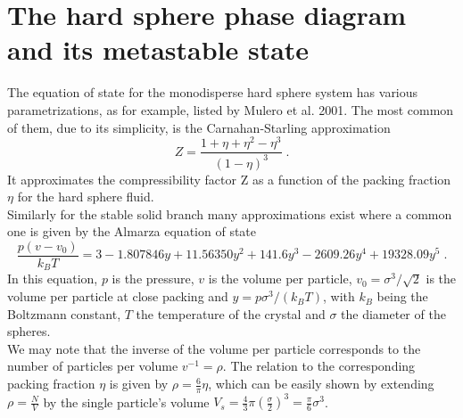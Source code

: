\section{The hard sphere phase diagram and its metastable state}
\label{sec:HS_phase_diagram}
The equation of state for the monodisperse hard sphere system has various parametrizations, as for example, listed by Mulero et al. 2001\cite{Mulero2001}. The most common of them, due to its simplicity, is the Carnahan-Starling approximation\cite{Carnahan1969}
\begin{equation}
\label{eqn:CS}
Z=\frac{1+\eta+\eta^2-\eta^3}{(1-\eta)^3} \; \text{.}
\end{equation}
It approximates the compressibility factor Z as a function of the packing fraction $\eta$ for the hard sphere fluid.\\

Similarly for the stable solid branch many approximations exist where a common one is given by the Almarza equation of state\cite{Almarza2009}
\begin{equation}
\frac{p(v-v_0)}{k_B T} = 3 - 1.807846 y + 11.56350 y^2 + 141.6 y^3 - 2609.26 y^4 + 19328.09 y^5 \; \text{.}
\end{equation}
In this equation, $p$ is the pressure, $v$ is the volume per particle, $v_0=\sigma^3/\sqrt{2}$ is the volume per particle at close packing and $y=p \sigma^3 / (k_B T)$, with $k_B$ being the Boltzmann constant, $T$ the temperature of the crystal and $\sigma$ the diameter of the spheres.\\
We may note that the inverse of the volume per particle corresponds to the number of particles per volume $ v^{-1} = \rho$. The relation to the corresponding packing fraction $\eta$ is given by $\rho = \frac{6}{ \pi} \eta$, which can be easily shown by extending $\rho = \frac{N}{V}$ by the single particle's volume $V_s = \frac{4}{3} \pi \left(\frac{\sigma}{2}\right)^3 = \frac{\pi}{6} \sigma^3$.\\

